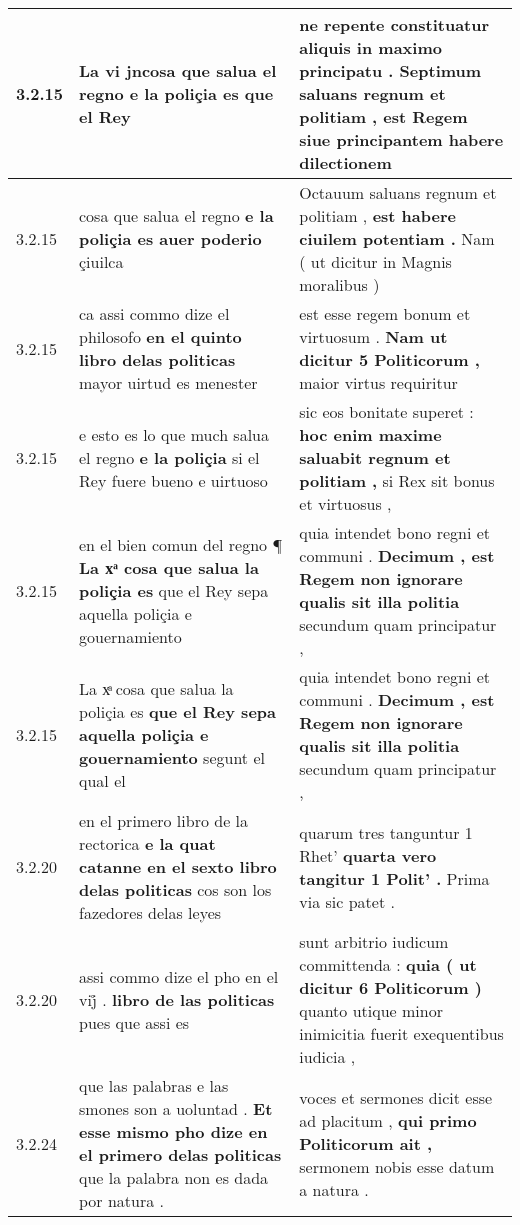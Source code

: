 \begin{tabular}{|p{1cm}|p{6.5cm}|p{6.5cm}|}
3.2.15 & La vi jncosa que salua el regno \textbf{ e la poliçia es } que el Rey & ne repente constituatur aliquis in maximo principatu . \textbf{ Septimum saluans regnum et politiam , } est Regem siue principantem habere dilectionem \\\hline
3.2.15 & cosa que salua el regno \textbf{ e la poliçia es auer poderio } çiuilca & Octauum saluans regnum et politiam , \textbf{ est habere ciuilem potentiam . } Nam ( ut dicitur in Magnis moralibus ) \\\hline
3.2.15 & ca assi commo dize el philosofo \textbf{ en el quinto libro delas politicas } mayor uirtud es menester & est esse regem bonum et virtuosum . \textbf{ Nam ut dicitur 5 Politicorum , } maior virtus requiritur \\\hline
3.2.15 & e esto es lo que much salua el regno \textbf{ e la poliçia } si el Rey fuere bueno e uirtuoso & sic eos bonitate superet : \textbf{ hoc enim maxime saluabit regnum et politiam , } si Rex sit bonus et virtuosus , \\\hline
3.2.15 & en el bien comun del regno ¶ \textbf{ La xͣ cosa que salua la poliçia es } que el Rey sepa aquella poliçia e gouernamiento & quia intendet bono regni et communi . \textbf{ Decimum , est Regem non ignorare qualis sit illa politia } secundum quam principatur , \\\hline
3.2.15 & La xͣ cosa que salua la poliçia es \textbf{ que el Rey sepa aquella poliçia e gouernamiento } segunt el qual el & quia intendet bono regni et communi . \textbf{ Decimum , est Regem non ignorare qualis sit illa politia } secundum quam principatur , \\\hline
3.2.20 & en el primero libro de la rectorica \textbf{ e la quat catanne en el sexto libro delas politicas } cos son los fazedores delas leyes & quarum tres tanguntur 1 Rhet’ \textbf{ quarta vero tangitur 1 Polit’ . } Prima via sic patet . \\\hline
3.2.20 & assi commo dize el pho en el vij̊ . \textbf{ libro de las politicas } pues que assi es & sunt arbitrio iudicum committenda : \textbf{ quia ( ut dicitur 6 Politicorum ) } quanto utique minor inimicitia fuerit exequentibus iudicia , \\\hline
3.2.24 & que las palabras e las smones son a uoluntad . \textbf{ Et esse mismo pho dize en el primero delas politicas } que la palabra non es dada por natura . & voces et sermones dicit esse ad placitum , \textbf{ qui primo Politicorum ait , } sermonem nobis esse datum a natura . \\\hline

\end{tabular}
